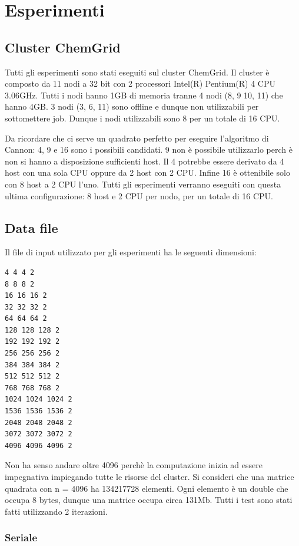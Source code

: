 \chapter{Esperimenti}

\section{Cluster ChemGrid}

Tutti gli esperimenti sono stati eseguiti sul cluster ChemGrid. Il cluster \`{e} composto da 11 nodi a 32 bit con 2 processori Intel(R) Pentium(R) 4 CPU 3.06GHz. Tutti i nodi hanno 1GB di memoria tranne 4 nodi (8, 9 10, 11) che hanno 4GB. 3 nodi (3, 6, 11) sono offline e dunque non utilizzabili per sottomettere job. Dunque i nodi utilizzabili sono 8 per un totale di 16 CPU.

Da ricordare che ci serve un quadrato perfetto per eseguire l'algoritmo di Cannon: 4, 9 e 16 sono i possibili candidati. 9 non \`{e} possibile utilizzarlo perch \`{e} non si hanno a disposizione sufficienti host.
Il 4 potrebbe essere derivato da 4 host con una sola CPU oppure da 2 host con 2 CPU. Infine 16 \`{e} ottenibile solo con 8 host a 2 CPU l'uno.
Tutti gli esperimenti verranno eseguiti con questa ultima configurazione: 8 host e 2 CPU per nodo, per un totale di 16 CPU.

\section{Data file}

Il file di input utilizzato per gli esperimenti ha le seguenti dimensioni:

\begin{lstlisting}
4 4 4 2
8 8 8 2
16 16 16 2
32 32 32 2
64 64 64 2
128 128 128 2
192 192 192 2
256 256 256 2
384 384 384 2
512 512 512 2
768 768 768 2
1024 1024 1024 2
1536 1536 1536 2
2048 2048 2048 2
3072 3072 3072 2
4096 4096 4096 2
\end{lstlisting}

Non ha senso andare oltre 4096 perch\`{e} la computazione inizia ad essere impegnativa impiegando tutte le risorse del cluster. Si consideri che una matrice quadrata con n = 4096 ha 134217728 elementi. Ogni elemento \`{e} un double che occupa 8 bytes, dunque una matrice occupa circa 131Mb.
Tutti i test sono stati fatti utilizzando 2 iterazioni.

\subsection{Seriale}

